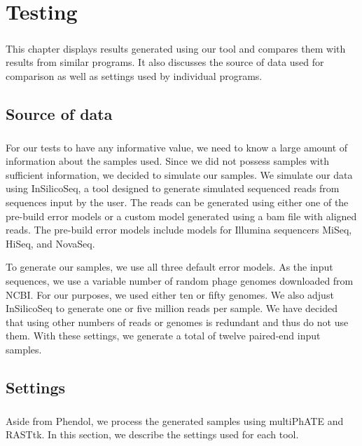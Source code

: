 \chapter{Testing}

\label{kap:testing} %
\paragraph*{}
This chapter displays results generated using our tool and compares them with results from similar programs. It also discusses the source of data used for comparison as well as settings used by individual programs.

\section{Source of data}
\paragraph*{}
For our tests to have any informative value, we need to know a large amount of information about the samples used. Since we did not possess samples with sufficient information, we decided to simulate our samples. We simulate our data using InSilicoSeq, a tool designed to generate simulated sequenced reads from sequences input by the user. The reads can be generated using either one of the pre-build error models or a custom model generated using a bam file with aligned reads. The pre-build error models include models for Illumina sequencers MiSeq, HiSeq, and NovaSeq.

To generate our samples, we use all three default error models. As the input sequences, we use a variable number of random phage genomes downloaded from NCBI. For our purposes, we used either ten or fifty genomes. We also adjust InSilicoSeq to generate one or five million reads per sample. We have decided that using other numbers of reads or genomes is redundant and thus do not use them. With these settings, we generate a total of twelve paired-end input samples.

\section{Settings}
\paragraph*{}
Aside from Phendol, we process the generated samples using multiPhATE and RASTtk. In this section, we describe the settings used for each tool.

